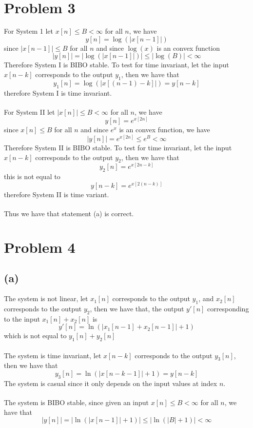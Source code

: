 \section*{Problem 3}
For System 1 let $x[n]\leq B <\infty$ for all $n$, we have
$$y[n]=\log(|x[n-1]|)$$
since $|x[n-1]|\leq B$ for all $n$ and since $\log(x)$ is an convex function
$$|y[n]|=|\log(|x[n-1]|)|\leq |\log(B)|<\infty$$
Therefore System I is BIBO stable. To test for time invariant, let 
the input $x[n-k]$ corresponds to the output $y_1$, then we have that
$$y_1[n]=\log(|x[(n-1)-k]|)=y[n-k]$$
therefore System I is time invariant.\\\\
For System II let $|x[n]|\leq B <\infty$ for all $n$, we have
$$y[n]=e^{x[2n]}$$
since $x[n]\leq B$ for all $n$ and since $e^x$ is an convex function, we have
$$|y[n]|=e^{x[2n]}\leq e^B<\infty$$
Therefore System II is BIBO stable. To test for time invariant, let
the input $x[n-k]$ corresponds to the output $y_2$, then we have that
$$y_2[n]=e^{x[2n-k]}$$
this is not equal to 
$$y[n-k]=e^{x[2(n-k)]}$$
therefore System II is time variant.\\\\
Thus we have that statement (a) is correct.
\section*{Problem 4}
\subsection*{(a)}
The system is not linear, let 
$x_1[n]$ corresponds to the output $y_1$, and $x_2[n]$ corresponds to the output $y_2$, then we have that, 
the output $y'[n]$ corresponding to the input $x_1[n]+x_2[n]$ is
$$y'[n]=\ln(|x_1[n-1]+x_2[n-1]|+1)$$
which is not equal to $y_1[n]+y_2[n]$\\\\
The system is time invariant, let $x[n-k]$ corresponds to the output $y_3[n]$, then we have that
$$y_3[n]=\ln(|x[n-k-1]|+1)=y[n-k]$$
The system is casual since it only depends on the input values at index $n$.\\\\
The system is BIBO stable, since given an input $x[n]\leq B<\infty$ for all $n$, we have that
$$|y[n]|=|\ln(|x[n-1]|+1)|\leq |\ln(|B|+1)|<\infty$$




